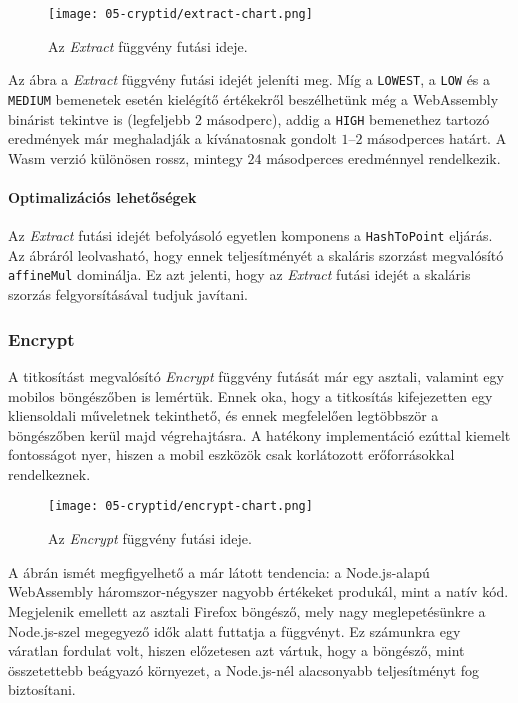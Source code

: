 \begin{figure}[h]
    \centering
    \texttt{[image: 05-cryptid/extract-chart.png]}
    \caption{Az \textit{Extract} függvény futási ideje.}
    \label{Figure::CryptID::ExtractChart}
\end{figure}

Az  ábra a \textit{Extract} függvény futási idejét jeleníti meg. Míg a \texttt{LOWEST}, a \texttt{LOW} és a \texttt{MEDIUM} bemenetek esetén kielégítő értékekről beszélhetünk még a WebAssembly binárist tekintve is (legfeljebb $2$ másodperc), addig a \texttt{HIGH} bemenethez tartozó eredmények már meghaladják a kívánatosnak gondolt $1$–$2$ másodperces határt. A Wasm verzió különösen rossz, mintegy $24$ másodperces eredménnyel rendelkezik.

\paragraph{Optimalizációs lehetőségek}

Az \textit{Extract} futási idejét befolyásoló egyetlen komponens a \texttt{HashToPoint} eljárás. Az  ábráról leolvasható, hogy ennek teljesítményét a skaláris szorzást megvalósító \texttt{affineMul} dominálja. Ez azt jelenti, hogy az \textit{Extract} futási idejét a skaláris szorzás felgyorsításával tudjuk javítani.

\subsubsection{Encrypt}

A titkosítást megvalósító \textit{Encrypt} függvény futását már egy asztali, valamint egy mobilos böngészőben is lemértük. Ennek oka, hogy a titkosítás kifejezetten egy kliensoldali műveletnek tekinthető, és ennek megfelelően legtöbbször a böngészőben kerül majd végrehajtásra. A hatékony implementáció ezúttal kiemelt fontosságot nyer, hiszen a mobil eszközök csak korlátozott erőforrásokkal rendelkeznek.

\begin{figure}[h]
    \centering
    \texttt{[image: 05-cryptid/encrypt-chart.png]}
    \caption{Az \textit{Encrypt} függvény futási ideje.}
    \label{Figure::CryptID::EncryptChart}
\end{figure}

A  ábrán ismét megfigyelhető a már látott tendencia: a Node.js-alapú WebAssembly háromszor-négyszer nagyobb értékeket produkál, mint a natív kód. Megjelenik emellett az asztali Firefox böngésző, mely nagy meglepetésünkre a Node.js-szel megegyező idők alatt futtatja a függvényt. Ez számunkra egy váratlan fordulat volt, hiszen előzetesen azt vártuk, hogy a böngésző, mint összetettebb beágyazó környezet, a Node.js-nél alacsonyabb teljesítményt fog biztosítani.

